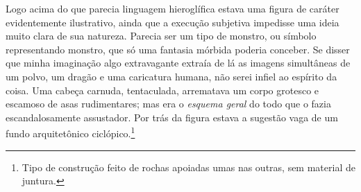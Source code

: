 Logo acima do que parecia linguagem hieroglífica estava uma figura de
caráter evidentemente ilustrativo, ainda que a execução subjetiva
impedisse uma ideia muito clara de sua natureza. Parecia ser
um tipo de monstro, ou símbolo representando monstro, que só
uma fantasia mórbida poderia conceber. Se disser que minha imaginação
algo extravagante extraía de lá as imagens simultâneas de um polvo, um
dragão e uma caricatura humana, não serei infiel ao espírito da coisa.
Uma cabeça carnuda, tentaculada, arrematava um corpo grotesco e escamoso
de asas rudimentares; mas era o \emph{esquema geral} do todo que o fazia
escandalosamente assustador. Por trás da figura estava a sugestão vaga
de um fundo arquitetônico ciclópico.\footnote{Tipo de construção feito de
  rochas apoiadas umas nas outras, sem material de juntura.}

